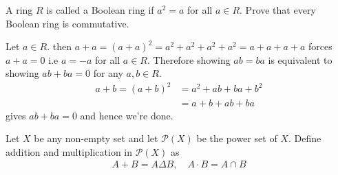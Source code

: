\documentclass[12pt]{exam}
\theoremstyle{plain} %
\theoremstyle{definition} %
\theoremstyle{remark} %
\begin{document}
\begin{questions}
\begin{solution}
  \end{solution}

  \question
  A ring $R$ is called a Boolean ring if $a^2 = a$ for all $ a \in
  R$. Prove that every Boolean ring is commutative.
  \begin{solution}
    Let $a \in R$. then $a + a = (a + a)^2 = a^2 + a^2 + a^2 + a^2 =
    a+ a + a+ a$ forces $a + a = 0$ i.e $a = -a$ for all $a \in R$.
    Therefore showing $ab = ba$ is equivalent to showing $ab + ba =
    0$ for any $a, b \in R$.
    \begin{align*}
      a + b = (a + b)^2 &= a^2 + ab + ba + b^2 \\
      &= a + b + ab + ba
    \end{align*}
    gives $ab + ba = 0$ and hence we're done.
  \end{solution}

  \question
  Let $X$ be any non-empty set and let $\mathcal{P}(X)$ be the power
  set of $X$. Define addition and multiplication in $\mathcal{P}(X)$ as
  \begin{align*}
    A + B = A \Delta B, \quad A \cdot B = A \cap B
  \end{align*}
  \begin{solution}
    \begin{parts}

\end{parts}
\end{solution}
\end{questions}
\end{document}
